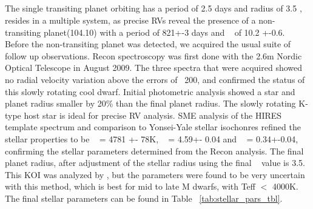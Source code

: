 \documentclass{emulateapj}
\begin{document}






\subsection{\koionezerofour}  %

The single transiting planet orbiting {\koionezerofour} has a period of 2.5 days and radius of 3.5 \rearth, resides in a multiple system, as precise RVs reveal the presence of a non-transiting planet(104.10) with a period of 821+-3 days and \msini~ of 10.2 +-0.6\mjup. Before the non-transiting planet was detected, we acquired the usual suite of follow up observations. Recon spectroscopy was first done with the 2.6m Nordic Optical Telescope in August 2009.  The three spectra that were acquired showed no radial velocity variation above the errors of ~200\ms, and confirmed the status of this slowly rotating cool dwarf. Initial photometric analysis showed a star and planet radius smaller by 20\% than the final planet radius. The slowly rotating K-type host star is ideal for precise RV analysis.    SME analysis of the HIRES template spectrum and comparison to Yonsei-Yale stellar isochonres  refined the stellar properties to be \teff~ = 4781 +- 78K, \logg~ = 4.59+- 0.04 and \feh~ = 0.34+-0.04, confirming the stellar parameters determined from the Recon analysis. The final planet radius, after adjustment of the stellar radius using the final \logg~ value is 3.5\rearthe.  This KOI was analyzed by \citep{Muirhead2012b}, but the parameters were found to be very uncertain with this method, which is best for mid to late M dwarfs, with Teff $<$ 4000K.  The final stellar parameters can be found in Table ~\ref{tab:stellar_pars_tbl}.
\end{document}
